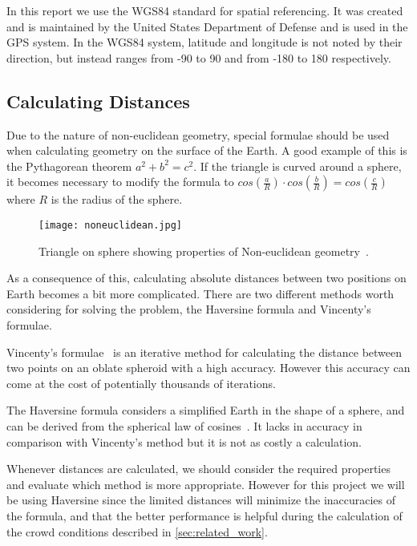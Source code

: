 In this report we use the WGS84 standard for spatial referencing. It was created and is maintained by the United States Department of Defense \cite{WGS84} and is used in the GPS system. In the WGS84 system, latitude and longitude is not noted by their direction, but instead ranges from -90 to 90 and from -180 to 180 respectively.

\subsection{Calculating Distances}

Due to the nature of non-euclidean geometry, special formulae should be used when calculating geometry on the surface of the Earth. A good example of this is the Pythagorean theorem $a^2 + b^2 = c^2$. If the triangle is curved around a sphere, it becomes necessary to modify the formula to $cos(\frac{a}{R}) \cdot cos(\frac{b}{R}) = cos(\frac{c}{R})$ where $R$ is the radius of the sphere\cite{website:lawofcosines}.

\begin{figure}[htbp]
    \centering
\texttt{[image: noneuclidean.jpg]}
\caption[Triangle on sphere]{Triangle on sphere showing properties of Non-euclidean geometry~\cite{earthtriangle}.}
\label{noneuclidean}
\end{figure}

As a consequence of this, calculating absolute distances between two positions on Earth becomes a bit more complicated. There are two different methods worth considering for solving the problem, the Haversine formula and Vincenty's formulae.

Vincenty's formulae~\cite{vincenty} is an iterative method for calculating the distance between two points on an oblate spheroid with a high accuracy. However this accuracy can come at the cost of potentially thousands of iterations.

The Haversine formula considers a simplified Earth in the shape of a sphere, and can be derived from the spherical law of cosines~\cite{website:lawofcosines}. It lacks in accuracy in comparison with Vincenty's method but it is not as costly a calculation.

Whenever distances are calculated, we should consider the required properties and evaluate which method is more appropriate. However for this project we will be using Haversine since the limited distances will minimize the inaccuracies of the formula, and that the better performance is helpful during the calculation of the crowd conditions described in \cref{sec:related_work}.


